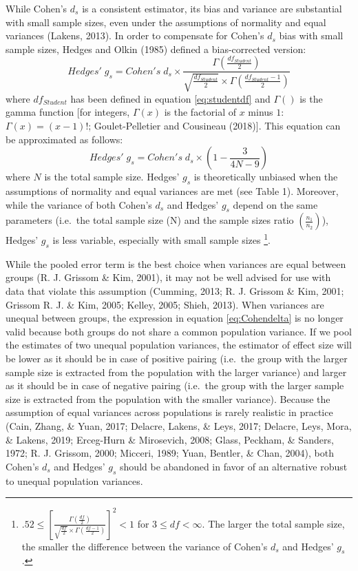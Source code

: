 \documentclass[
  english,
  man,floatsintext]{apa6}
\begin{document}
While Cohen's \(d_s\) is a consistent estimator, its bias and variance are substantial with small sample sizes, even under the assumptions of normality and equal variances (Lakens, 2013). In order to compensate for Cohen's \(d_s\) bias with small sample sizes, Hedges and Olkin (1985) defined a bias-corrected version:
\begin{equation*} 
Hedges' \; g_s = Cohen's \; d_s \times \frac{\Gamma(\frac{df_{Student}}{2})}{\sqrt{\frac{df_{Student}}{2}} \times \Gamma(\frac{df_{Student}-1}{2})}
\label{eq:Hedgesgs}
\end{equation*}
where \(df_{Student}\) has been defined in equation \ref{eq:studentdf} and \(\Gamma()\) is the gamma function {[}for integers, \(\Gamma(x)\) is the factorial of \(x\) minus \(1\): \(\Gamma(x)=(x-1)!\); Goulet-Pelletier and Cousineau (2018){]}. This equation can be approximated as follows:
\begin{equation*} 
Hedges' \; g_s = Cohen's \; d_s \times \left( 1- \frac{3}{4N -9} \right)
\label{eq:Hedgesgsapprox}
\end{equation*}
where \(N\) is the total sample size. Hedges' \(g_s\) is theoretically unbiased when the assumptions of normality and equal variances are met (see Table 1). Moreover, while the variance of both Cohen's \(d_s\) and Hedges' \(g_s\) depend on the same parameters (i.e.~the total sample size (N) and the sample sizes ratio \(\left(\frac{n_1}{n_2}\right)\)), Hedges' \(g_s\) is less variable, especially with small sample sizes \footnote{$.52 \le \left[\frac{\Gamma(\frac{df}{2})}{\sqrt{\frac{df}{2}} \times \Gamma(\frac{df-1}{2})} \right] ^2 < 1$ for $3 \le df < \infty$. The larger the total sample size, the smaller the difference between the variance of Cohen's $d_s$ and Hedges' $g_s$.}.

While the pooled error term is the best choice when variances are equal between groups (R. J. Grissom \& Kim, 2001), it may not be well advised for use with data that violate this assumption (Cumming, 2013; R. J. Grissom \& Kim, 2001; Grissom R. J. \& Kim, 2005; Kelley, 2005; Shieh, 2013). When variances are unequal between groups, the expression in equation \ref{eq:Cohendelta} is no longer valid because both groups do not share a common population variance. If we pool the estimates of two unequal population variances, the estimator of effect size will be lower as it should be in case of positive pairing (i.e.~the group with the larger sample size is extracted from the population with the larger variance) and larger as it should be in case of negative pairing (i.e.~the group with the larger sample size is extracted from the population with the smaller variance). Because the assumption of equal variances across populations is rarely realistic in practice (Cain, Zhang, \& Yuan, 2017; Delacre, Lakens, \& Leys, 2017; Delacre, Leys, Mora, \& Lakens, 2019; Erceg-Hurn \& Mirosevich, 2008; Glass, Peckham, \& Sanders, 1972; R. J. Grissom, 2000; Micceri, 1989; Yuan, Bentler, \& Chan, 2004), both Cohen's \(d_s\) and Hedges' \(g_s\) should be abandoned in favor of an alternative robust to unequal population variances.
\end{document}
